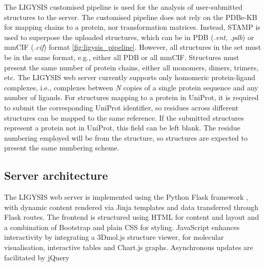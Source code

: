 The LIGYSIS customised pipeline is used for the analysis of user-submitted structures to the server. The customised pipeline does not rely on the PDBe-KB for mapping chains to a protein, nor transformation matrices. Instead, STAMP \cite{RUSSELL_1992_STAMP} is used to superpose the uploaded structures, which can be in PDB (\textit{.ent}, \textit{.pdb}) or mmCIF (\textit{.cif}) format \autoref{fig:ligysis_pipeline}. However, all structures in the set must be in the same format, e.g., either all PDB or all mmCIF. Structures must present the same number of protein chains, either all monomers, dimers, trimers, etc. The LIGYSIS web server currently supports only homomeric protein-ligand complexes, i.e., complexes between \textit{N} copies of a single protein sequence and any number of ligands. For structures mapping to a protein in UniProt, it is required to submit the corresponding UniProt identifier, so residues across different structures can be mapped to the same reference. If the submitted structures represent a protein not in UniProt, this field can be left blank. The residue numbering employed will be from the structure, so structures are expected to present the same numbering scheme.

\subsection{Server architecture}

The LIGYSIS web server is implemented using the Python Flask framework \cite{GRINBERG_2018_FLASK}, with dynamic content rendered via Jinja \cite{JINJA} templates and data transferred through Flask routes. The frontend is structured using HTML for content and layout and a combination of Bootstrap \cite{BOOTSTRAP} and plain CSS \cite{HTML_CSS} for styling. JavaScript \cite{JAVASCRIPT} enhances interactivity by integrating a 3Dmol.js \cite{REGO_2014_3DMOL, SESHADRI_2020_3DMOL} structure viewer, for molecular visualisation, interactive tables and Chart.js \cite{CHARTJS} graphs. Asynchronous updates are facilitated by jQuery \cite{jQUERY}

